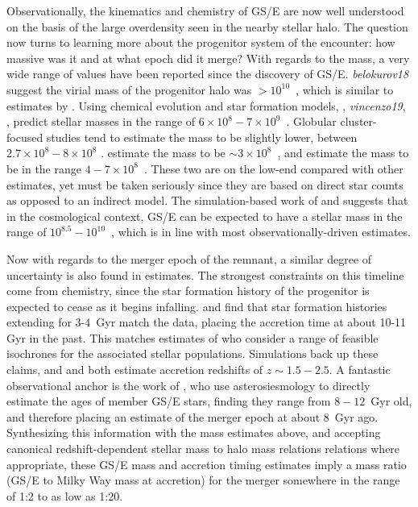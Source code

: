 Observationally, the kinematics and chemistry of GS/E are now well understood on the basis of the large overdensity seen in the nearby stellar halo. The question now turns to learning more about the progenitor system of the encounter: how massive was it and at what epoch did it merge? With regards to the mass, a very wide range of values have been reported since the discovery of GS/E. \textit{belokurov18} suggest the virial mass of the progenitor halo was $> 10^{10}$~\Msun, which is similar to estimates by \textcite{das20}. Using chemical evolution and star formation models, \textcite{helmi18}, \textit{vincenzo19}, \textcite{feuillet20}, predict stellar masses in the range of $6\times10^{8} - 7\times10^{9}$~\Msun. Globular cluster-focused studies tend to estimate the mass to be slightly lower, between $2.7\times10^{8}-8\times10^{8}$ \parencite{kruijssen20,forbes20}. \textcite{mackereth20} estimate the mass to be $\sim 3\times10^{8}$~\Msun, and \textcite{naidu20} estimate the mass to be in the range $4-7\times10^{8}$~\Msun. These two are on the low-end compared with other estimates, yet must be taken seriously since they are based on direct star counts as opposed to an indirect model. The simulation-based work of \textcite{fattahi19} and \textcite{mackereth19a} suggests that in the cosmological context, GS/E can be expected to have a stellar mass in the range of $10^{8.5}-10^{10}$~\Msun, which is in line with most observationally-driven estimates.

Now with regards to the merger epoch of the remnant, a similar degree of uncertainty is also found in estimates. The strongest constraints on this timeline come from chemistry, since the star formation history of the progenitor is expected to cease as it begins infalling. \textcite{vincenzo19} and \textcite{sanders21} find that star formation histories extending for 3-4~Gyr match the data, placing the accretion time at about 10-11 Gyr in the past. This matches estimates of \textcite{helmi18} who consider a range of feasible isochrones for the associated stellar populations. Simulations back up these claims, and \textcite{fattahi19} and \textcite{mackereth19a} both estimate accretion redshifts of $z \sim 1.5-2.5$. A fantastic observational anchor is the work of \textcite{montalban21}, who use asterosiesmology to directly estimate the ages of member GS/E stars, finding they range from $8-12$~Gyr old, and therefore placing an estimate of the merger epoch at about 8~Gyr ago. Synthesizing this information with the mass estimates above, and accepting canonical redshift-dependent stellar mass to halo mass relations relations where appropriate, these GS/E mass and accretion timing estimates imply a mass ratio (GS/E to Milky Way mass at accretion) for the merger somewhere in the range of 1:2 to as low as 1:20.

